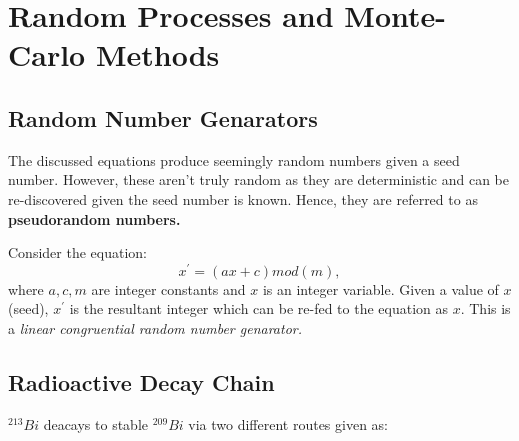 \section{Random Processes and Monte-Carlo Methods}
\subsection{Random Number Genarators}
The discussed equations produce seemingly random numbers given a seed number. However, these aren't truly random as they are deterministic and can be re-discovered given the seed number is known. Hence, they are referred to as \textbf{pseudorandom numbers.}
\par 
Consider the equation:
$$x^{\prime}=(ax+c) mod (m), $$
where $a,c,m$ are integer constants and $x$ is an integer variable. Given a value of $x$ (seed), $x^{\prime}$ is the resultant integer which can be re-fed to the equation as $x$. This is a \textit{linear congruential random number genarator.}
\subsection{Radioactive Decay Chain}
$^{213}Bi$ deacays to stable $^{209}Bi$ via two different routes given as:

